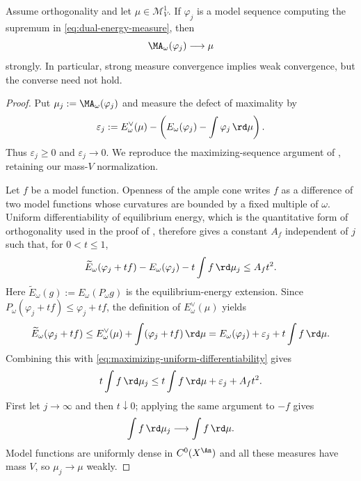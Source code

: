 \begin{theorem}
\label{thm:finite-energy-measure-stability}
Assume orthogonality and let \(\mu\in\mathcal M^1_V\).  If
\(\varphi_j\) is a model sequence computing the supremum in
\eqref{eq:dual-energy-measure}, then
\[
                     \MA_\omega(\varphi_j)\longrightarrow\mu
\]
strongly.  In particular, strong measure convergence implies weak
convergence, but the converse need not hold.
\end{theorem}
\begin{proof}
Put $\mu_j:=\MA_\omega(\varphi_j)$ and measure the defect of maximality by
\[
 \varepsilon_j:=E_\omega^\vee(\mu)-
 \left(E_\omega(\varphi_j)-\int\varphi_j\,\rd\mu\right).
\]
Thus $\varepsilon_j\geq0$ and $\varepsilon_j\to0$.  We reproduce the
maximizing-sequence argument of
\cite[Theorem~2.23]{BJ25FiniteEnergy}, retaining our mass-$V$
normalization.

Let $f$ be a model function.  Openness of the ample cone writes $f$ as a
difference of two model functions whose curvatures are bounded by a fixed
multiple of $\omega$.  Uniform differentiability of equilibrium energy,
which is the quantitative form of orthogonality used in the proof of
, therefore gives a constant
$A_f$ independent of $j$ such that, for $0<t\leq1$,
\begin{equation}\label{eq:maximizing-uniform-differentiability}
 \widetilde E_\omega(\varphi_j+tf)-E_\omega(\varphi_j)
   -t\int f\,\rd\mu_j
 \leq A_f t^2.
\end{equation}
Here
$\widetilde E_\omega(g):=E_\omega(P_\omega g)$ is the equilibrium-energy
extension.  Since $P_\omega(\varphi_j+tf)\leq\varphi_j+tf$, the definition
of $E_\omega^\vee(\mu)$ yields
\[
 \widetilde E_\omega(\varphi_j+tf)
 \leq E_\omega^\vee(\mu)+
      \int(\varphi_j+tf)\,\rd\mu
 =E_\omega(\varphi_j)+\varepsilon_j+
      t\int f\,\rd\mu.
\]
Combining this with
\eqref{eq:maximizing-uniform-differentiability} gives
\[
 t\int f\,\rd\mu_j
 \leq t\int f\,\rd\mu+\varepsilon_j+A_ft^2.
\]
First let $j\to\infty$ and then $t\downarrow0$; applying the same argument
to $-f$ gives
\[
                     \int f\,\rd\mu_j\longrightarrow
                     \int f\,\rd\mu.
\]
Model functions are uniformly dense in $C^0(X^{\An})$ and all these
measures have mass $V$, so $\mu_j\to\mu$ weakly.


\end{proof}
